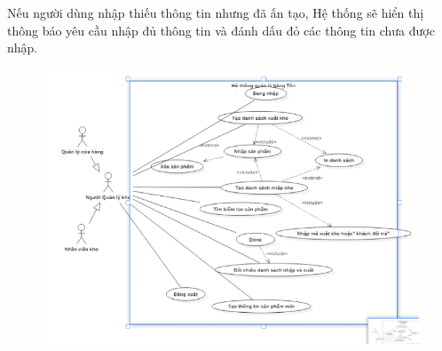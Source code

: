 \documentclass{article}
\begin{document}
Nếu người dùng nhập thiếu thông tin nhưng đã ấn tạo, Hệ thống sẽ hiển thị thông báo yêu cầu nhập đủ thông tin và đánh dấu đỏ các thông tin chưa được nhập. \\
    \begin{figure}
        \centering
        \includegraphics{6.png}
    \end{figure}
\end{document}
